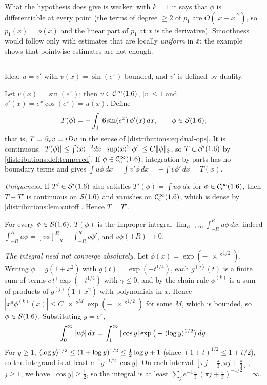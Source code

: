 What the hypothesis does give is weaker: with $k=1$ it says that $\phi$ is
differentiable at every point (the terms of degree $\ge2$ of $p_1$ are
$O(|x-\bar x|^2)$, so $p_1(\bar x)=\phi(\bar x)$ and the linear part of $p_1$ at $\bar x$
is the derivative). Smoothness would follow only with estimates that are locally
\emph{uniform} in $\bar x$; the example shows that pointwise estimates are not enough.

\subsection*{}
Idea: $u=v'$ with $v(x)=\sin(e^x)$ bounded, and $v'$ is defined by duality.

Let $v(x)=\sin(e^x)$; then $v\in\mathcal{C}^\infty(1.6)$, $|v|\le1$ and $v'(x)=e^x\cos(e^x)=u(x)$. Define
\[
  T(\phi)=-\int_1.6\sin(e^x)\,\phi'(x)\,dx,\qquad\phi\in\mathcal{S}(1.6),
\]
that is, $T=\partial_xv=iDv$ in the sense of \eqref{distributions:eq:dual-ops}. It is
continuous:
$|T(\phi)|\le\int\langle x\rangle^{-2}dx\cdot\sup\langle x\rangle^2|\phi'|\le C\lVert \phi\rVert_3$, so
$T\in\mathcal{S}'(1.6)$ by \cref{distributions:def:tempered}. If $\phi\in\mathcal{C}^\infty_{\mathrm{c}}(1.6)$, integration
by parts has no boundary terms and gives $\int u\phi\,dx=\int v'\phi\,dx=-\int v\phi'\,dx=T(\phi)$.

\emph{Uniqueness.} If $T'\in\mathcal{S}'(1.6)$ also satisfies $T'(\phi)=\int u\phi\,dx$ for
$\phi\in\mathcal{C}^\infty_{\mathrm{c}}(1.6)$, then $T-T'$ is continuous on $\mathcal{S}(1.6)$ and vanishes on $\mathcal{C}^\infty_{\mathrm{c}}(1.6)$,
which is dense by \cref{distributions:lem:cutoff}. Hence $T=T'$.

For every $\phi\in\mathcal{S}(1.6)$, $T(\phi)$ is the improper integral
$\lim_{R\to\infty}\int_{-R}^Ru\phi\,dx$: indeed
$\int_{-R}^Ru\phi=[v\phi]_{-R}^R-\int_{-R}^Rv\phi'$, and $v\phi(\pm R)\to0$.

\emph{The integral need not converge absolutely.} Let $\phi(x)=\exp(-\ang{x}^{1/2})$. Writing
$\phi=g(1+x^2)$ with $g(t)=\exp(-t^{1/4})$, each $g^{(j)}(t)$ is a finite sum of terms
$c\,t^{\gamma}\exp(-t^{1/4})$ with $\gamma\le0$, and by the chain rule $\phi^{(k)}$ is a
sum of products of $g^{(j)}(1+x^2)$ with polynomials in $x$. Hence
$|x^a\phi^{(k)}(x)|\le C\ang{x}^{M}\exp(-\ang{x}^{1/2})$ for some $M$, which is bounded,
so $\phi\in\mathcal{S}(1.6)$. Substituting $y=e^x$,
\[
  \int_0^\infty|u\phi|\,dx=\int_1^\infty|\cos y|\exp\big(-\langle \log y\rangle^{1/2}\big)\,dy.
\]
For $y\ge1$, $\langle \log y\rangle^{1/2}\le(1+\log y)^{1/2}\le\frac12\log y+1$ (since
$(1+t)^{1/2}\le1+t/2$), so the integrand is at least $e^{-1}y^{-1/2}|\cos y|$. On each
interval $[\pi j-\frac\pi3,\pi j+\frac\pi3]$, $j\ge1$, we have $|\cos y|\ge\frac12$, so the
integral is at least $\sum_j e^{-1}\frac\pi3\,(\pi j+\frac\pi3)^{-1/2}=\infty$.

